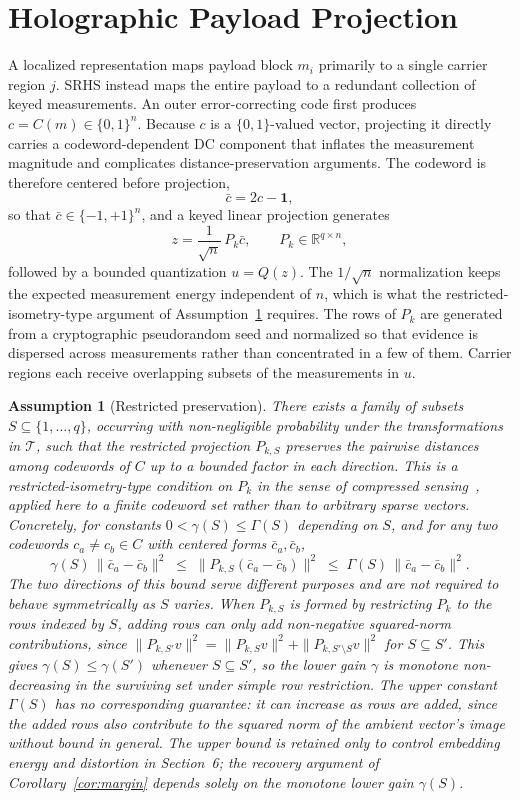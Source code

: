 \documentclass[11pt]{article}
\newtheorem{assumption}{Assumption}
\begin{document}
\section{Holographic Payload Projection}

A localized representation maps payload block $m_i$ primarily to a single carrier region $j$. SRHS instead maps the entire payload to a redundant collection of keyed measurements. An outer error-correcting code first produces $c = C(m) \in \{0,1\}^n$. Because $c$ is a $\{0,1\}$-valued vector, projecting it directly carries a codeword-dependent DC component that inflates the measurement magnitude and complicates distance-preservation arguments. The codeword is therefore centered before projection,
\[
\bar c = 2c - \mathbf{1},
\]
so that $\bar c \in \{-1,+1\}^n$, and a keyed linear projection generates
\[
z = \frac{1}{\sqrt n}\,P_k \bar c, \qquad P_k \in \mathbb{R}^{q \times n},
\]
followed by a bounded quantization $u = Q(z)$. The $1/\sqrt n$ normalization keeps the expected measurement energy independent of $n$, which is what the restricted-isometry-type argument of Assumption~\ref{as:rip} requires. The rows of $P_k$ are generated from a cryptographic pseudorandom seed and normalized so that evidence is dispersed across measurements rather than concentrated in a few of them. Carrier regions each receive overlapping subsets of the measurements in $u$.

\begin{assumption}[Restricted preservation]
\label{as:rip}
There exists a family of subsets $S \subseteq \{1,\dots,q\}$, occurring with non-negligible probability under the transformations in $\mathcal{T}$, such that the restricted projection $P_{k,S}$ preserves the pairwise distances among codewords of $C$ up to a bounded factor in each direction. This is a restricted-isometry-type condition on $P_k$ in the sense of compressed sensing~\cite{candestao2006}, applied here to a finite codeword set rather than to arbitrary sparse vectors. Concretely, for constants $0 < \gamma(S) \le \Gamma(S)$ depending on $S$, and for any two codewords $c_a \ne c_b \in C$ with centered forms $\bar c_a,\bar c_b$,
\[
\gamma(S)\,\|\bar c_a-\bar c_b\|^2 \;\le\; \|P_{k,S}(\bar c_a-\bar c_b)\|^2 \;\le\; \Gamma(S)\,\|\bar c_a-\bar c_b\|^2.
\]
The two directions of this bound serve different purposes and are not required to behave symmetrically as $S$ varies. When $P_{k,S}$ is formed by restricting $P_k$ to the rows indexed by $S$, adding rows can only add non-negative squared-norm contributions, since $\|P_{k,S'}v\|^2 = \|P_{k,S}v\|^2 + \|P_{k,S'\setminus S}v\|^2$ for $S \subseteq S'$. This gives $\gamma(S) \le \gamma(S')$ whenever $S \subseteq S'$, so the lower gain $\gamma$ is monotone non-decreasing in the surviving set under simple row restriction. The upper constant $\Gamma(S)$ has no corresponding guarantee: it can increase as rows are added, since the added rows also contribute to the squared norm of the ambient vector's image without bound in general. The upper bound is retained only to control embedding energy and distortion in Section~6; the recovery argument of Corollary~\ref{cor:margin} depends solely on the monotone lower gain $\gamma(S)$.
\end{assumption}
\end{document}
